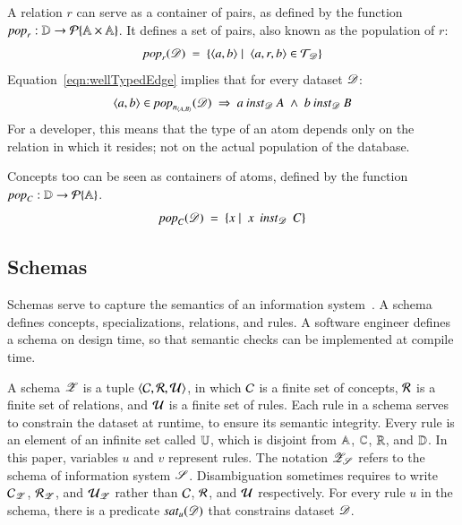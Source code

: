 \documentclass{elsarticle}
\begin{document}
   A relation $r$ can serve as a container of pairs,
   as defined by the function $\text{\it pop\/}_r:\mathbb{D}\rightarrow\cal{P}\{\mathbb{A}\times\mathbb{A}\}$.
   It defines a set of pairs, also known as the population of $r$:
\begin{equation}
   \pop{r}{\dataset}\ =\ \{ \pair{a}{b}\mid\ \triple{a}{r}{b}\in\triples_{\dataset}\}
\label{eqn:pop-rel}
\end{equation}
   Equation~\ref{eqn:wellTypedEdge} implies that for every dataset $\mathscr{D}$:
\[\pair{a}{b}\in\pop{\declare{n}{A}{B}}{\dataset}\ \Rightarrow\ a\inst_{\dataset}A\ \wedge\ b\inst_{\dataset}B\]
   For a developer, this means that the type of an atom depends only on the relation in which it resides; not on the actual population of the database.

   Concepts too can be seen as containers of atoms,
   defined by the function $\text{\it pop\/}_C:\mathbb{D}\rightarrow\cal{P}\{\mathbb{A}\}$.
\begin{equation}
   \pop{C}{\dataset}\ =\ \{ x\mid\ x\ \inst_{\dataset}\ C\}
\label{eqn:pop-concept}
\end{equation}

\subsection{Schemas}
\label{sct:Schemas}
   Schemas serve to capture the semantics of an information system~\cite{Spivak2012}.
   A schema defines concepts, specializations, relations, and rules.
   A software engineer defines a schema on design time, so that semantic checks can be implemented at compile time.

   A schema $\mathscr{Z}$ is a tuple $\langle{\mathcal{C}},{\mathcal{R}},{\mathcal{U}}\rangle$,
   in which $\mathcal{C}$ is a finite set of concepts,
   $\mathcal{R}$ is a finite set of relations,
   and $\mathcal{U}$ is a finite set of rules.
   Each rule in a schema serves to constrain the dataset at runtime, to ensure its semantic integrity.
   Every rule is an element of an infinite set called $\mathbb{U}$,
   which is disjoint from $\mathbb{A}$, $\mathbb{C}$, $\mathbb{R}$, and $\mathbb{D}$.
   In this paper, variables $u$ and $v$ represent rules.
   The notation $\mathscr{Z}_{\mathscr{S}}$ refers to the schema of information system $\mathscr{S}$.
   Disambiguation sometimes requires to write $\mathcal{C}_{\mathscr{Z}}$, $\mathcal{R}_{\mathscr{Z}}$, and $\mathcal{U}_{\mathscr{Z}}$
   rather than $\mathcal{C}$, $\mathcal{R}$, and $\mathcal{U}$ respectively.
   For every rule $u$ in the schema, there is a predicate $\text{\it sat\/}_{u}(\mathscr{D})$ that constrains dataset $\mathscr{D}$.
\end{document}
